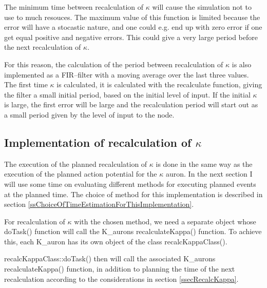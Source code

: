 		The minimum time between recalculation of $\kappa$ will cause the simulation not to use to much resouces.
		The maximum value of this function is limited because the error will have a stocastic nature, and one could e.g. end up with zero error if one get equal positive and negative errors.
		This could give a very large period before the next recalculation of $\kappa$.

		For this reason, the calculation of the period between recalculation of $\kappa$ is also implemented as a FIR--filter with a moving average over the last three values.
		The first time $\kappa$ is calculated, it is calculated with the recalculate function, giving the filter a small initial period, based on the initial level of input.
		If the initial $\kappa$ is large, the first error will be large and the recalculation period will start out as a small period given by the level of input to the node.

		\subsection{Implementation of recalculation of $\kappa$}
		The execution of the planned recalculation of $\kappa$ is done in the same way as the execution of the planned action potential for the $\kappa$ auron.
		In the next section I will use some time on evaluating different methods for executing planned events at the planned time.
		The choice of method for this implementation is described in section \ref{ssChoiceOfTimeEstimationForThisImplementation}.
		
		For recalculation of $\kappa$ with the chosen method, we need a separate object whose doTask() function will call the K\_aurons recalculateKappa() function.
		To achieve this, each K\_auron has its own object of the class recalcKappaClass().

		recalcKappaClass::doTask() then will call the associated K\_aurons recalculateKappa() function, in addition to planning the time of the next recalculation according to the considerations in section \ref{ssecRecalcKappa}.
		






